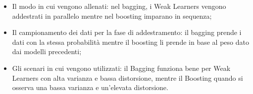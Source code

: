         \begin{itemize}
            \item Il modo in cui vengono allenati: nel bagging, i Weak Learners vengono addestrati in parallelo mentre nel boosting imparano in sequenza;
            \item Il campionamento dei dati per la fase di addestramento: il bagging prende i dati con la stessa probabilità mentre il boosting li prende in base al peso dato dai modelli precedenti;
            \item Gli scenari in cui vengono utilizzati: il Bagging funziona bene per Weak Learners con alta varianza e bassa distorsione, mentre il Boosting quando si osserva una bassa varianza e un'elevata distorsione.
        \end{itemize}

    \clearpage